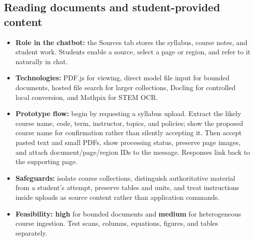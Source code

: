 \documentclass[11pt]{article}
\begin{document}
\subsection{Reading documents and student-provided content}
\begin{itemize}
\item \textbf{Role in the chatbot:} the Sources tab stores the syllabus, course notes, and student work. Students enable a source, select a page or region, and refer to it naturally in chat.
\item \textbf{Technologies:} PDF.js for viewing, direct model file input for bounded documents, hosted file search for larger collections, Docling for controlled local conversion, and Mathpix for STEM OCR.\cite{pdfjs,files,retrieval,docling,mathpix}
\item \textbf{Prototype flow:} begin by requesting a syllabus upload. Extract the likely course name, code, term, instructor, topics, and policies; show the proposed course name for confirmation rather than silently accepting it. Then accept pasted text and small PDFs, show processing status, preserve page images, and attach document/page/region IDs to the message. Responses link back to the supporting page.
\item \textbf{Safeguards:} isolate course collections, distinguish authoritative material from a student's attempt, preserve tables and units, and treat instructions inside uploads as source content rather than application commands.
\item \textbf{Feasibility: high} for bounded documents and \textbf{medium} for heterogeneous course ingestion. Test scans, columns, equations, figures, and tables separately.
\end{itemize}
\end{document}
